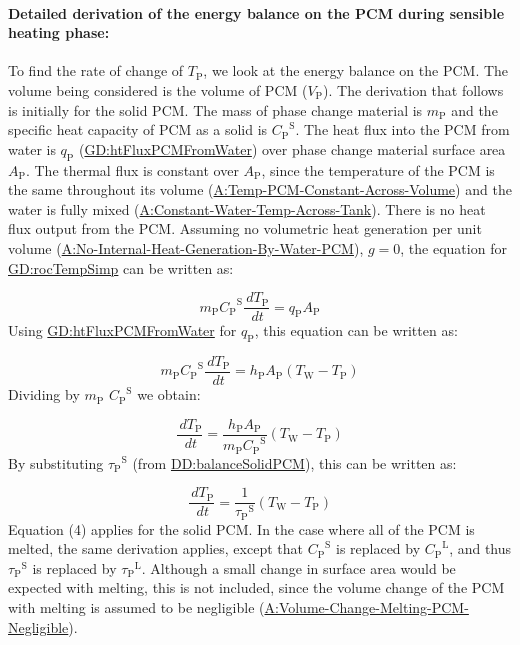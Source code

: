 \documentclass[12pt]{article}
\begin{document}
\paragraph{Detailed derivation of the energy balance on the PCM during sensible heating phase:}
\label{IM:eBalanceOnPCMDeriv}
To find the rate of change of ${T_{\text{P}}}$, we look at the energy balance on the PCM. The volume being considered is the volume of PCM (${V_{\text{P}}}$). The derivation that follows is initially for the solid PCM. The mass of phase change material is ${m_{\text{P}}}$ and the specific heat capacity of PCM as a solid is ${{C_{\text{P}}}^{\text{S}}}$. The heat flux into the PCM from water is ${q_{\text{P}}}$ (\hyperref[GD:htFluxPCMFromWater]{GD:htFluxPCMFromWater}) over phase change material surface area ${A_{\text{P}}}$. The thermal flux is constant over ${A_{\text{P}}}$, since the temperature of the PCM is the same throughout its volume (\hyperref[assumpTPCAV]{A:Temp-PCM-Constant-Across-Volume}) and the water is fully mixed (\hyperref[assumpCWTAT]{A:Constant-Water-Temp-Across-Tank}). There is no heat flux output from the PCM. Assuming no volumetric heat generation per unit volume (\hyperref[assumpNIHGBWP]{A:No-Internal-Heat-Generation-By-Water-PCM}), $g=0$, the equation for \hyperref[GD:rocTempSimp]{GD:rocTempSimp} can be written as:

\begin{displaymath}
{m_{\text{P}}} {{C_{\text{P}}}^{\text{S}}} \frac{\,d{T_{\text{P}}}}{\,dt}={q_{\text{P}}} {A_{\text{P}}}
\end{displaymath}
Using \hyperref[GD:htFluxPCMFromWater]{GD:htFluxPCMFromWater} for ${q_{\text{P}}}$, this equation can be written as:

\begin{displaymath}
{m_{\text{P}}} {{C_{\text{P}}}^{\text{S}}} \frac{\,d{T_{\text{P}}}}{\,dt}={h_{\text{P}}} {A_{\text{P}}} \left({T_{\text{W}}}-{T_{\text{P}}}\right)
\end{displaymath}
Dividing by ${m_{\text{P}}}$ ${{C_{\text{P}}}^{\text{S}}}$ we obtain:

\begin{displaymath}
\frac{\,d{T_{\text{P}}}}{\,dt}=\frac{{h_{\text{P}}} {A_{\text{P}}}}{{m_{\text{P}}} {{C_{\text{P}}}^{\text{S}}}} \left({T_{\text{W}}}-{T_{\text{P}}}\right)
\end{displaymath}
By substituting ${{τ_{\text{P}}}^{\text{S}}}$ (from \hyperref[DD:balanceSolidPCM]{DD:balanceSolidPCM}), this can be written as:

\begin{displaymath}
\frac{\,d{T_{\text{P}}}}{\,dt}=\frac{1}{{{τ_{\text{P}}}^{\text{S}}}} \left({T_{\text{W}}}-{T_{\text{P}}}\right)
\end{displaymath}
Equation (4) applies for the solid PCM. In the case where all of the PCM is melted, the same derivation applies, except that ${{C_{\text{P}}}^{\text{S}}}$ is replaced by ${{C_{\text{P}}}^{\text{L}}}$, and thus ${{τ_{\text{P}}}^{\text{S}}}$ is replaced by ${{τ_{\text{P}}}^{\text{L}}}$. Although a small change in surface area would be expected with melting, this is not included, since the volume change of the PCM with melting is assumed to be negligible (\hyperref[assumpVCMPN]{A:Volume-Change-Melting-PCM-Negligible}).
\end{document}
